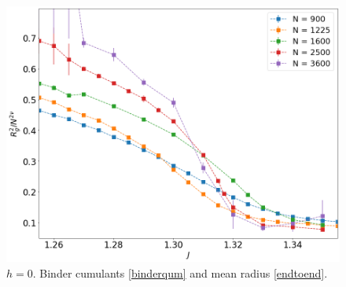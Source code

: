 \begin{figure}[H]
 	\includegraphics[scale=0.23]{Images/rscaling_longchains.png} 	
 	
 	\caption{$h=0$. Binder  cumulants \eqref{binderqum} and mean radius \eqref{endtoend}.  }
 	\label{fig:bcshort}
 \end{figure}


